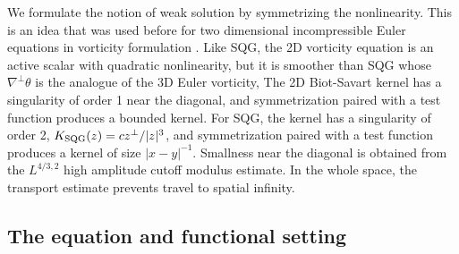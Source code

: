 \documentclass[11pt,reqno]{amsproc}
\begin{document}
We formulate the notion of weak solution by symmetrizing the nonlinearity. This is an idea that was used before for two dimensional
incompressible Euler equations in vorticity formulation  \cite{Delort1991, Schochet1995}. Like SQG, the 2D vorticity equation is an active scalar with quadratic nonlinearity, 
but it is smoother than SQG whose $\nabla^{\perp}\theta$ is the analogue of the  3D Euler vorticity, The 2D Biot-Savart kernel has a singularity of order 1 near 
the diagonal, and  symmetrization paired with a test function produces a bounded kernel.  For SQG, the kernel has a singularity of order 2, 
\(K_{\rm SQG}(z)=c z^\perp/|z|^3\), and symmetrization paired with a test function produces  a kernel of size
\(|x-y|^{-1}\).  Smallness near
the diagonal is obtained from the $L^{4/3,2}$ high amplitude cutoff  modulus estimate.  In the whole
space, the transport estimate prevents travel to spatial infinity.  

\subsection{The equation and functional setting}\label{subsec:setting}
\end{document}
